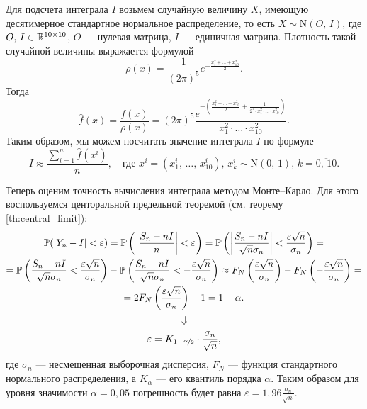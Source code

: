 Для подсчета интеграла $I$ возьмем случайную величину $X$, имеющую десятимерное стандартное нормальное распределение, то есть $X \sim \mbox{N} (O,\,I)$, где $O,\,I \in \mathbb{R}^{10 \times 10}$, $O$ --- нулевая матрица, $I$ --- единичная матрица. Плотность такой случайной величины выражается формулой
$$
        \rho(x)
        =
        \frac{1}{(2\pi)^5}
        e^{-\frac{x_1^2 + \ldots + x_{10}^2}{2}}.
$$
Тогда
$$
\boxed{
        \hat f(x) = \frac{f(x)}{\rho(x)}
        =
        (2\pi)^5
        \frac
        {
                e^{-\left(\frac{x_1^2 + \ldots + x_{10}^2}{2} + \frac{1}{2^7 \cdot x_1^2 \cdot \ldots \cdot x_{10}^2}\right)}
        }
        {x_1^2 \cdot \ldots \cdot x_{10}^2}.
}
$$
Таким образом, мы можем посчитать значение интеграла $I$ по формуле
$$
\boxed{
        I
        \approx
        \frac
        {\sum_{i=1}^{n} \hat f(x^i)}
        {n},
        \quad
        \mbox{где $x^i = (x_1^i,\,\ldots,\,x_{10}^i)$, $x_k^i\sim\mbox{N}(0,\,1)$, $k = \overline{0,\,10}$.}
}
$$

Теперь оценим точность вычисления интеграла методом Монте--Карло. Для этого воспользуемся центоральной предельной теоремой (см. теорему \ref{th:central_limit}):
\begin{multline*}
        \mathbb{P}(|Y_n - I| < \varepsilon)
        =
        \mathbb{P}\left( \left| \frac{S_n - nI}{n} \right| < \varepsilon \right)
        =
        \mathbb{P}\left( \left| \frac{S_n - nI}{\sqrt{n}\sigma_n} \right| < \frac{\varepsilon\sqrt{n}}{\sigma_n} \right)
        =\\=
        \mathbb{P}\left( \frac{S_n - nI}{\sqrt{n}\sigma_n}  < \frac{\varepsilon\sqrt{n}}{\sigma_n} \right)
        -
        \mathbb{P}\left( \frac{S_n - nI}{\sqrt{n}\sigma_n}  < -\frac{\varepsilon\sqrt{n}}{\sigma_n} \right)
        \approx
        F_N\left(\frac{\varepsilon\sqrt{n}}{\sigma_n}\right) - F_N\left(-\frac{\varepsilon\sqrt{n}}{\sigma_n}\right)
        =\\=
        2 F_N\left(\frac{\varepsilon\sqrt{n}}{\sigma_n}\right) - 1
        =
        1 - \alpha.
\end{multline*}
$$
        \Downarrow
$$
$$
        \varepsilon = K_{1 - \nicefrac{\alpha}{2}}\cdot \frac{\sigma_n}{\sqrt{n}},
$$
где $\sigma_n$ --- несмещенная выборочная дисперсия, $F_N$ --- функция стандартного нормального распределения, а $K_\alpha$ --- его квантиль порядка $\alpha$. Таким образом для уровня значимости $\alpha = 0,05$ погрешность будет равна $\varepsilon = 1,96\frac{\sigma_n}{\sqrt{n}}$.
